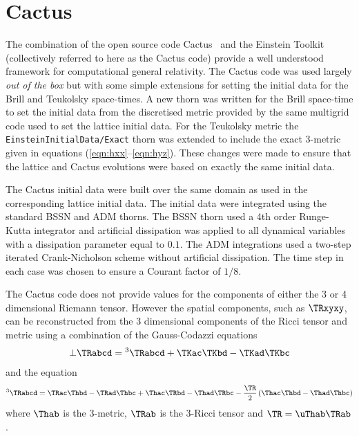 \documentclass[a4paper,12pt]{article}
\numberwithin{equation}{section}
\begin{document}
\section{Cactus}
\label{sec:CactusCode}

The combination of the open source code Cactus~\cite{goodale:2002-01} and the Einstein
Toolkit~\cite{loffler:2011-01} (collectively referred to here as the Cactus code) provide a
well understood framework for computational general relativity. The Cactus code was used
largely \emph{out of the box} but with some simple extensions for setting the initial data
for the Brill and Teukolsky space-times. A new thorn was written for the Brill space-time to
set the initial data from the discretised metric provided by the same multigrid code used to
set the lattice initial data. For the Teukolsky metric the {\tt EinsteinInitialData/Exact}
thorn was extended to include the exact 3-metric given in equations
(\ref{eqn:hxx}--\ref{eqn:hyz}). These changes were made to ensure that the lattice and
Cactus evolutions were based on exactly the same initial data.

The Cactus initial data were built over the same domain as used in the corresponding lattice
initial data. The initial data were integrated using the standard BSSN and ADM thorns. The
BSSN thorn used a 4th order Runge-Kutta integrator and artificial dissipation was applied to
all dynamical variables with a dissipation parameter equal to $0.1$. The ADM integrations
used a two-step iterated Crank-Nicholson scheme without artificial dissipation. The time
step in each case was chosen to ensure a Courant factor of $1/8$.

The Cactus code does not provide values for the components of either the 3 or 4
dimensional Riemann tensor. However the spatial components, such as $\TRxyxy$, can be
reconstructed from the 3 dimensional components of the Ricci tensor and metric using a
combination of the Gauss-Codazzi equations
\begin{align}
   \bot \TRabcd = {}^3 \TRabcd + \TKac\TKbd - \TKad\TKbc
\end{align}
and the equation
\begin{align}
   {}^3\TRabcd =   \TRac\Thbd-\TRad\Thbc
                 + \Thac\TRbd-\Thad\TRbc
                 - \frac{\TR}{2} \left(\Thac\Thbd-\Thad\Thbc\right)
\end{align}
where $\Thab$ is the 3-metric, $\TRab$ is the 3-Ricci tensor and $\TR = \uThab \TRab$.
\end{document}
